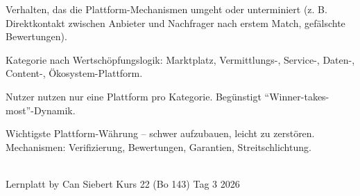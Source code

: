 \documentclass[11pt,a4paper,oneside]{article}
\begin{document}
\begin{description}[style=nextline,leftmargin=0pt,labelindent=0pt,itemsep=4pt]
  \item[Plattformmissbrauch] Verhalten, das die Plattform-Mechanismen umgeht oder unterminiert (z. B. Direktkontakt zwischen Anbieter und Nachfrager nach erstem Match, gefälschte Bewertungen).
  \item[Plattformtyp] Kategorie nach Wertschöpfungslogik: Marktplatz, Vermittlungs-, Service-, Daten-, Content-, Ökosystem-Plattform.
  \item[Single-Homing] Nutzer nutzen nur eine Plattform pro Kategorie. Begünstigt ``Winner-takes-most''-Dynamik.
  \item[Vertrauen] Wichtigste Plattform-Währung -- schwer aufzubauen, leicht zu zerstören. Mechanismen: Verifizierung, Bewertungen, Garantien, Streitschlichtung.
\end{description}

\vspace{1cm}
\noindent{\color{lpAccent}\rule{\linewidth}{0.6pt}}\\[4pt]
{\footnotesize\sffamily\color{lpGray}Lernplatt \textperiodcentered{} by Can Siebert \textperiodcentered{} Kurs 22 (Bo 143) \textperiodcentered{} Tag 3 \textperiodcentered{} \textcopyright{} 2026}
\end{document}
